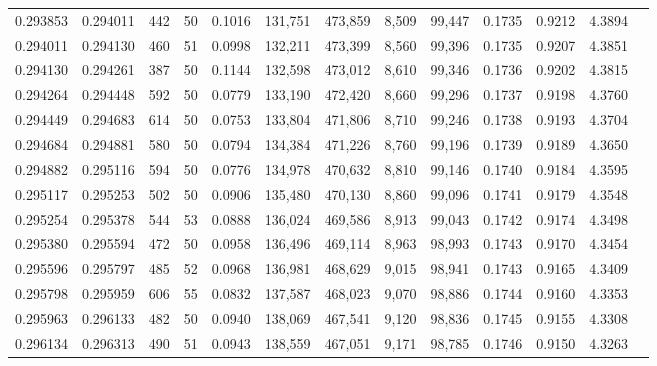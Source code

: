 \begin{tabular}{rrrrrrrrrrrrr}
0.293853 & 0.294011 &   442 &  50 &                                     0.1016 & 131,751 & 473,859 &   8,509 &  99,447 & 0.1735 & 0.9212 & 4.3894 \\
0.294011 & 0.294130 &   460 &  51 &                                     0.0998 & 132,211 & 473,399 &   8,560 &  99,396 & 0.1735 & 0.9207 & 4.3851 \\
0.294130 & 0.294261 &   387 &  50 &                                     0.1144 & 132,598 & 473,012 &   8,610 &  99,346 & 0.1736 & 0.9202 & 4.3815 \\
0.294264 & 0.294448 &   592 &  50 &                                     0.0779 & 133,190 & 472,420 &   8,660 &  99,296 & 0.1737 & 0.9198 & 4.3760 \\
0.294449 & 0.294683 &   614 &  50 &                                     0.0753 & 133,804 & 471,806 &   8,710 &  99,246 & 0.1738 & 0.9193 & 4.3704 \\
0.294684 & 0.294881 &   580 &  50 &                                     0.0794 & 134,384 & 471,226 &   8,760 &  99,196 & 0.1739 & 0.9189 & 4.3650 \\
0.294882 & 0.295116 &   594 &  50 &                                     0.0776 & 134,978 & 470,632 &   8,810 &  99,146 & 0.1740 & 0.9184 & 4.3595 \\
0.295117 & 0.295253 &   502 &  50 &                                     0.0906 & 135,480 & 470,130 &   8,860 &  99,096 & 0.1741 & 0.9179 & 4.3548 \\
0.295254 & 0.295378 &   544 &  53 &                                     0.0888 & 136,024 & 469,586 &   8,913 &  99,043 & 0.1742 & 0.9174 & 4.3498 \\
0.295380 & 0.295594 &   472 &  50 &                                     0.0958 & 136,496 & 469,114 &   8,963 &  98,993 & 0.1743 & 0.9170 & 4.3454 \\
0.295596 & 0.295797 &   485 &  52 &                                     0.0968 & 136,981 & 468,629 &   9,015 &  98,941 & 0.1743 & 0.9165 & 4.3409 \\
0.295798 & 0.295959 &   606 &  55 &                                     0.0832 & 137,587 & 468,023 &   9,070 &  98,886 & 0.1744 & 0.9160 & 4.3353 \\
0.295963 & 0.296133 &   482 &  50 &                                     0.0940 & 138,069 & 467,541 &   9,120 &  98,836 & 0.1745 & 0.9155 & 4.3308 \\
0.296134 & 0.296313 &   490 &  51 &                                     0.0943 & 138,559 & 467,051 &   9,171 &  98,785 & 0.1746 & 0.9150 & 4.3263 \\

\end{tabular}

